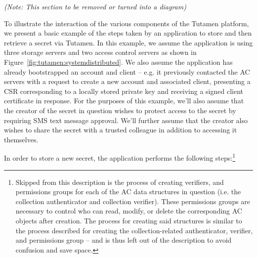 {\em(Note: This section to be removed or turned into a diagram)}

To illustrate the interaction of the various components of the Tutamen
platform, we present a basic example of the steps taken by an
application to store and then retrieve a secret via Tutamen. In this
example, we assume the application is using three storage servers and
two access control servers as shown in
Figure~\ref{fig:tutamen:systemdistributed}. We also assume the
application has already bootstrapped an account and client -- e.g. it
previously contacted the AC servers with a request to create a new
account and associated client, presenting a CSR corresponding to a
locally stored private key and receiving a signed client certificate
in response. For the purposes of this example, we'll also assume that
the creator of the secret in question wishes to protect access to the
secret by requiring SMS text message approval. We'll further assume
that the creator also wishes to share the secret with a trusted
colleague in addition to accessing it themselves.

In order to store a new secret, the application performs the following
steps:\footnote{Skipped from this description is the process of
  creating verifiers, and permissions groups for each of the AC data
  structures in question (i.e. the collection authenticator and
  collection verifier). These permissions groups are necessary to
  control who can read, modify, or delete the corresponding AC objects
  after creation. The process for creating said structures is similar
  to the process described for creating the collection-related
  authenticator, verifier, and permissions group -- and is thus left
  out of the description to avoid confusion and save space.}

